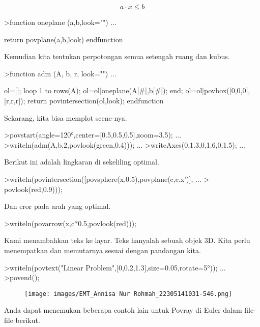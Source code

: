 \documentclass[a4paper,10pt]{article}
\begin{document}
\begin{eulernotebook}
\begin{eulercomment}
\end{eulercomment}
\begin{eulerformula}
\[
a \cdot x \le b
\]
\end{eulerformula}
\begin{eulerprompt}
>function oneplane (a,b,look="") ...
\end{eulerprompt}
\begin{eulerudf}
    return povplane(a,b,look)
  endfunction
\end{eulerudf}
\begin{eulercomment}
Kemudian kita tentukan perpotongan semua setengah ruang dan kubus.
\end{eulercomment}
\begin{eulerprompt}
>function adm (A, b, r, look="") ...
\end{eulerprompt}
\begin{eulerudf}
    ol=[];
    loop 1 to rows(A); ol=ol|oneplane(A[#],b[#]); end;
    ol=ol|povbox([0,0,0],[r,r,r]);
    return povintersection(ol,look);
  endfunction
\end{eulerudf}
\begin{eulercomment}
Sekarang, kita bisa memplot scene-nya.
\end{eulercomment}
\begin{eulerprompt}
>povstart(angle=120°,center=[0.5,0.5,0.5],zoom=3.5); ...
>writeln(adm(A,b,2,povlook(green,0.4))); ...
>writeAxes(0,1.3,0,1.6,0,1.5); ...
\end{eulerprompt}
\begin{eulercomment}
Berikut ini adalah lingkaran di sekeliling optimal.
\end{eulercomment}
\begin{eulerprompt}
>writeln(povintersection([povsphere(x,0.5),povplane(c,c.x')], ...
>  povlook(red,0.9)));
\end{eulerprompt}
\begin{eulercomment}
Dan eror pada arah yang optimal.
\end{eulercomment}
\begin{eulerprompt}
>writeln(povarrow(x,c*0.5,povlook(red)));
\end{eulerprompt}
\begin{eulercomment}
Kami menambahkan teks ke layar. Teks hanyalah sebuah objek 3D. Kita
perlu menempatkan dan memutarnya sesuai dengan pandangan kita.
\end{eulercomment}
\begin{eulerprompt}
>writeln(povtext("Linear Problem",[0,0.2,1.3],size=0.05,rotate=5°)); ...
>povend();
\end{eulerprompt}
\begin{figure}[h]
    \centering
    \texttt{[image: images/EMT\_Annisa Nur Rohmah\_22305141031-546.png]}
\end{figure}
\begin{eulercomment}
Anda dapat menemukan beberapa contoh lain untuk Povray di Euler dalam
file-file berikut.


\end{eulercomment}
\end{eulernotebook}
\end{document}
